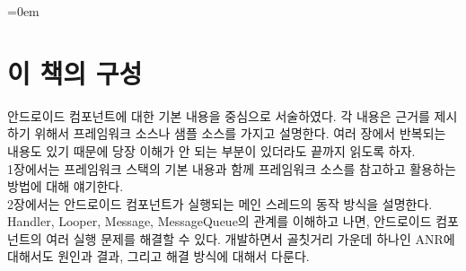 \documentclass[a4paper,hidelinks,10pt,openany]{book} %
\begin{document}
\begin{comment}
나도 책과 인터넷에서 많은 도움을 받았다. 
오래 전 팀 동료가 그런 얘기를 했다. ``국내 IT서적은 다 쓰레기다'' 그 동료는 책 꽂이에 원서만 나열해놓고 있었다.
어쩌면 쓰레기 하나를 더 만들었는지도 모르겠다.

좌충우돌한 이야기

죄와벌 이나 태백산맥 같은 역작을 내는 것도 아닌데, 무슨 시간이 이리 많이 걸리는지..

많은 격려를 해준 강용석님에게도 감사..
\end{comment}

\tableofcontents

\parindent=0em


\newpage

\begin{comment}
\begin{abstract}
잘 만든 앱은 다 그럭저럭이지만, 그렇지 않은 앱은 제각각의 이유가 있다. 여기서는 그럭저럭한 앱을 만드는 원리와 방법을 찾아보고, 문제를 발생시키는 제각각의 이유에 대해서도 얘기해보자.
\end{abstract}
\end{comment}

\chapter*{이 책의 구성}
안드로이드 컴포넌트에 대한 기본 내용을 중심으로 서술하였다. 각 내용은 근거를 제시하기 위해서 프레임워크 소스나 샘플 소스를 가지고 설명한다.
여러 장에서 반복되는 내용도 있기 때문에 당장 이해가 안 되는 부분이 있더라도 끝까지 읽도록 하자.\\

1장에서는 프레임워크 스택의 기본 내용과 함께 프레임워크 소스를 참고하고 활용하는 방법에 대해 얘기한다.\\

2장에서는 안드로이드 컴포넌트가 실행되는 메인 스레드의 동작 방식을 설명한다.
Handler, Looper, Message, MessageQueue의 관계를 이해하고 나면, 안드로이드 컴포넌트의 여러 실행 문제를 해결할 수 있다. 
개발하면서 골칫거리 가운데 하나인 ANR에 대해서도 원인과 결과, 그리고 해결 방식에 대해서 다룬다.\\
\end{document}
